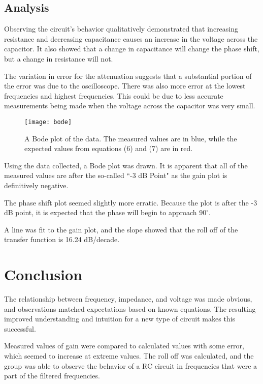 \documentclass[twocolumn, amsmath]{revtex4}
\begin{document}
 
\subsection{Analysis}

Observing the circuit's behavior qualitatively demonstrated that increasing resistance and decreasing capacitance causes an increase in the voltage across the capacitor. It also showed that a change in capacitance will change the phase shift, but a change in resistance will not.

The variation in error for the attenuation suggests that a substantial portion of the error was due to the oscilloscope. There was also more error at the lowest frequencies and highest frequencies. This could be due to less accurate measurements being made when the voltage across the capacitor was very small.

\begin{figure}[h]
    \texttt{[image: bode]}
    \caption{A Bode plot of the data. The measured values are in blue, while the expected values from equations (6) and (7) are in red.}
\end{figure}

Using the data collected, a Bode plot was drawn. It is apparent that all of the measured values are after the so-called ``-3 dB Point" as the gain plot is definitively negative.

The phase shift plot seemed slightly more erratic. Because the plot is after the -3 dB point, it is expected that the phase will begin to approach $90^\circ$.

A line was fit to the gain plot, and the slope showed that the roll off of the transfer function is 16.24 dB/decade. 


\section{Conclusion}
The relationship between frequency, impedance, and voltage was made obvious, and observations matched expectations based on known equations. The resulting improved understanding and intuition for a new type of circuit makes this successful.

Measured values of gain were compared to calculated values with some error, which seemed to increase at extreme values. The roll off was calculated, and the group was able to observe the behavior of a RC circuit in frequencies that were a part of the filtered frequencies.
\end{document}
